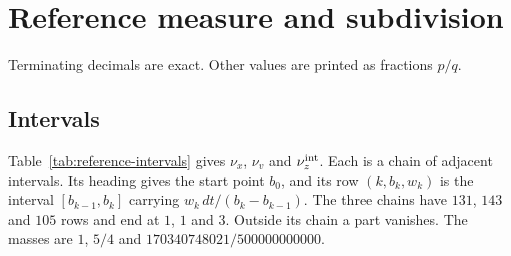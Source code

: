 \documentclass{amsart}
\numberwithin{equation}{section}
\numberwithin{table}{section}
\begin{document}
\section{Reference measure and subdivision}\label{app:reference-data}
Terminating decimals are exact. Other values are printed as fractions $p/q$.

\subsection{Intervals}
Table~\ref{tab:reference-intervals} gives $\nu_x$, $\nu_v$ and
$\nu_z^{\rm int}$. Each is a chain of adjacent intervals. Its heading gives
the start point $b_0$, and its row $(k,b_k,w_k)$ is the interval
$[b_{k-1},b_k]$ carrying $w_k\,dt/(b_k-b_{k-1})$. The three chains have
$131$, $143$ and $105$ rows and end at $1$, $1$ and $3$. Outside its chain a
part vanishes. The masses are $1$, $5/4$ and $170340748021/500000000000$.
\begingroup\small
\setlength{\tabcolsep}{4pt}\renewcommand{\arraystretch}{1.12}
\end{document}

